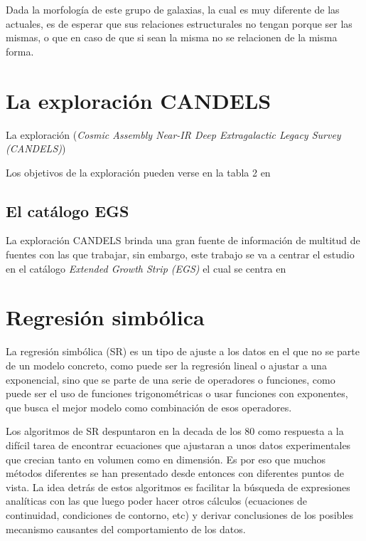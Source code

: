 \documentclass[11pt, a4paper]{article} %
\begin{document}
Dada la morfología de este grupo de galaxias, la cual es muy diferente de las actuales, es de esperar que sus relaciones estructurales 
no tengan porque ser las mismas, o que en caso de que si sean la misma no se relacionen de la misma forma. 
\section{La exploración CANDELS}

La exploración (\textit{Cosmic Assembly Near-IR Deep Extragalactic Legacy Survey (CANDELS)})\autocite{Grogin,Koekemoer}



Los objetivos de la exploración pueden verse en la tabla 2 en \autocite{Grogin}

\subsection{El catálogo EGS}

La exploración CANDELS brinda una gran fuente de información de multitud de fuentes con las que trabajar, sin embargo, este
trabajo se va a centrar el estudio en el catálogo \textit{Extended Growth Strip (EGS)} el cual se centra en 

\autocite{Stefanon,Kodra_2023}
\section{Regresión simbólica}

La regresión simbólica (SR) es un tipo de ajuste a los datos en el que no se parte de un 
modelo concreto, como puede ser la regresión lineal o ajustar a una exponencial, sino que 
se parte de una serie de operadores o funciones, como puede ser el uso de funciones trigonométricas 
o usar funciones con exponentes, que busca el mejor modelo como combinación de esos operadores.  


Los algoritmos de SR despuntaron en la decada de los 80 como respuesta a la difícil tarea de encontrar ecuaciones que 
ajustaran a unos datos experimentales que crecian tanto en volumen como en dimensión. Es por eso que muchos métodos diferentes
se han presentado desde entonces con diferentes puntos de vista. La idea detrás de estos algoritmos es facilitar la búsqueda
de expresiones analíticas con las que luego poder hacer otros cálculos (ecuaciones de continuidad, condiciones de contorno, etc)
y derivar conclusiones de los posibles mecanismo causantes del comportamiento de los datos. 
\end{document}
